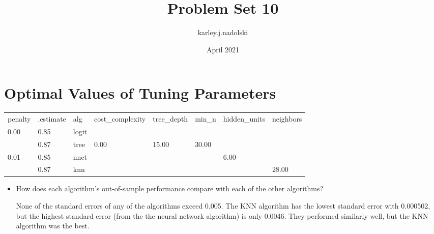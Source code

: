 \documentclass{article}
\title{Problem Set 10}
\author{karley.j.nadolski }
\date{April 2021}
\begin{document}
\maketitle

\section{Optimal Values of Tuning Parameters}
\begin{table} [h]
\begin{tabular}[t]{llllllll}
penalty & .estimate & alg & cost\_complexity & tree\_depth & min\_n & hidden\_units & neighbors\\
0.00 & 0.85 & logit &  &  &  &  & \\
 & 0.87 & tree & 0.00 & 15.00 & 30.00 &  & \\
0.01 & 0.85 & nnet &  &  &  & 6.00 & \\
 & 0.87 & knn &  &  &  &  & 28.00\\
\end{tabular}
\end{table}

\begin{itemize}
    \item How does each algorithm's out-of-sample performance compare with each of the other algorithms? 
    
    None of the standard errors of any of the algorithms exceed 0.005. The KNN algorithm has the lowest standard error with 0.000502, but the highest standard error (from the the neural network algorithm) is only 0.0046. They performed similarly well, but the KNN algorithm was the best. 
\end{itemize}
\end{document}
